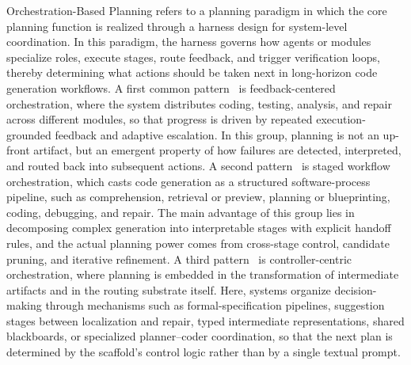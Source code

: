 Orchestration-Based Planning refers to a planning paradigm in which the core planning function is realized through a harness design for system-level coordination. In this paradigm, the harness governs how agents or modules specialize roles, execute stages, route feedback, and trigger verification loops, thereby determining what actions should be taken next in long-horizon code generation workflows.
A first common pattern~\cite{huang2023agentcoder,ukai2024adacoder,Nunez2024AutoSafeCoder} is feedback-centered orchestration, where the system distributes coding, testing, analysis, and repair across different modules, so that progress is driven by repeated execution-grounded feedback and adaptive escalation. In this group, planning is not an up-front artifact, but an emergent property of how failures are detected, interpreted, and routed back into subsequent actions. A second pattern~\cite{islam2024mapcoder,Pan2025CodeCoR,mao2025blueprint2code} is staged workflow orchestration, which casts code generation as a structured software-process pipeline, such as comprehension, retrieval or preview, planning or blueprinting, coding, debugging, and repair. The main advantage of this group lies in decomposing complex generation into interpretable stages with explicit handoff rules, and the actual planning power comes from cross-stage control, candidate pruning, and iterative refinement. A third pattern~\cite{khan2025macog,doualgoforge,zhang2026sgagent,lu2025requirements} is controller-centric orchestration, where planning is embedded in the transformation of intermediate artifacts and in the routing substrate itself. Here, systems organize decision-making through mechanisms such as formal-specification pipelines, suggestion stages between localization and repair, typed intermediate representations, shared blackboards, or specialized planner–coder coordination, so that the next plan is determined by the scaffold’s control logic rather than by a single textual prompt.

